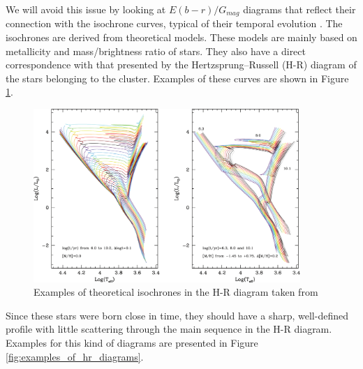 \documentclass[11pt, a4paper, english]{book}
\begin{document}
We will avoid this issue by looking at $E(b-r) / G_{mag}$ diagrams that reflect their connection with the isochrone curves,
typical of their temporal evolution \cite{bressan2012parsec}.
The isochrones are derived from theoretical models.
These models are mainly based on metallicity and mass/brightness ratio of stars.
They also have a direct correspondence with that presented by the Hertzsprung–Russell (H-R) diagram of the stars belonging to the cluster.
Examples of these curves are shown in Figure \ref{fig:examples_of_isochrones}.

\begin{figure}[htbp]
  \centering
  \includegraphics[width=0.9\textwidth]{../figures/theoretical_isochrones_in_hr_diagrams.pdf}
  \caption{Examples of theoretical isochrones in the H-R diagram taken from \protect{}}
  \label{fig:examples_of_isochrones}
\end{figure}

Since these stars were born close in time, they should have a sharp, well-defined profile with little scattering through the main sequence in the H-R diagram.
Examples for this kind of diagrams are presented in Figure \ref{fig:examples_of_hr_diagrams}.
\end{document}
